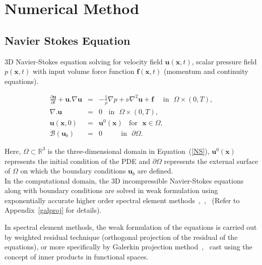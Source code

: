 
\chapter{Numerical Method} %

\label{Chapter2} %



\section{Navier Stokes Equation}
3D Navier-Stokes equation solving for velocity field $\pmb{u}(\pmb{x},t)$, scalar pressure field ${p(\pmb{x},t)}$ with input volume force function $\pmb{f}(\pmb{x},t)$ (momentum and continuity equations).
   
  \begin{eqnarray}
\frac{\partial \pmb{u}}{\partial t} + \pmb{u}.\nabla \pmb{u} & = & -\frac{1}{\rho}\nabla p + \nu \nabla^2 \pmb{u} + \pmb{f}  \ \ \ \ \ \   \mbox{in} \ \ \ {{\Omega}} \times (0,T), \nonumber \\
\nabla.{\pmb{u}} & = & 0 \ \ \ \ \mbox{in}\ \ \ {{\Omega}} \times (0,T), \nonumber \\
\pmb{u}(\pmb{x},0) &=& \pmb{u}^{0}(\pmb{x})\ \ \ \ \mbox{for}\ \ \ \pmb{x}\in\Omega, \nonumber \\
\mathcal{B}(\pmb{u}_{b}) & = & 0 \  \  \   \  \  \   \  \  \  \  \ \ \mbox{in} \ \ \ \partial {{\Omega}}. \label{NS}
\end{eqnarray} 

Here, ${\Omega} \subset \mathbb{R}^{3}$ is the three-dimensional domain in Equation~(\ref{NS}), $\pmb{
u}^{0}(\pmb{x})$ represents the initial condition of the PDE and $\partial{\Omega}$ represents the external surface of ${\Omega}$ on which the boundary conditions $\pmb{u}_b$ are defined. \\
In the computational domain, the 3D incompressible Navier-Stokes equations along with boundary conditions are solved in weak formulation using exponentially accurate higher order spectral element methods~\cite{patera3},~\cite{patera2},~\cite{fischer_jcp} (Refer to Appendix~\ref{galproj} for details). 
  

 In spectral element methods, the weak formulation of the equations is carried out by weighted residual technique (orthogonal projection of the residual of the equations), or more specifically by Galerkin projection method~\cite{fischer_jcp},~\cite{deville} cast using the concept of inner products in functional spaces.
 
